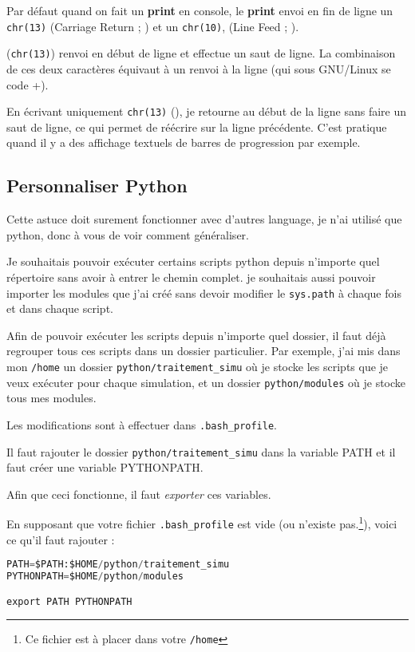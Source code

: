 \documentclass[a4paper,twoside]{article}
\begin{document}
Par défaut quand on fait un \textbf{print} en console, le \textbf{print} envoi en fin de ligne un \texttt{chr(13)} (Carriage Return ; ) et un \texttt{chr(10)}, (Line Feed ; ).

 (\texttt{chr(13)}) renvoi en début de ligne et  effectue un saut de ligne. La combinaison de ces deux caractères équivaut à un renvoi à la ligne (qui sous GNU/Linux se code +).

En écrivant uniquement \texttt{chr(13)} (), je retourne au début de la ligne sans faire un saut de ligne, ce qui permet de réécrire sur la ligne précédente. C'est pratique quand il y a des affichage textuels de barres de progression par exemple.


\subsection{Personnaliser Python}
Cette astuce doit surement fonctionner avec d'autres language, je  n'ai utilisé que python, donc à vous de voir comment généraliser.

Je souhaitais pouvoir exécuter certains scripts python depuis  n'importe quel répertoire sans avoir à entrer le chemin complet. je  souhaitais aussi pouvoir importer les modules que j'ai créé sans  devoir modifier le \texttt{sys.path} à chaque fois et dans chaque  script.

Afin de pouvoir exécuter les scripts depuis n'importe quel dossier,  il faut déjà regrouper tous ces scripts dans un dossier particulier.  Par exemple, j'ai mis dans mon \texttt{/home} un dossier \texttt {python/traitement\_simu} où je stocke les scripts que je veux  exécuter pour chaque simulation, et un dossier \texttt{python/modules} où je stocke tous mes modules.

Les modifications sont à effectuer dans \texttt{.bash\_profile}.

Il faut rajouter le dossier \texttt{python/traitement\_simu} dans la  variable PATH et il faut créer une variable PYTHONPATH.

\begin{attention}
Afin que ceci fonctionne, il faut \emph{exporter} ces variables.
\end{attention}

En supposant que votre fichier \texttt{.bash\_profile} est vide (ou  n'existe pas.\footnote{Ce fichier est à placer dans votre \texttt{/home}}), voici ce qu'il faut rajouter :
\begin{lstlisting}[language=python]
PATH=$PATH:$HOME/python/traitement_simu
PYTHONPATH=$HOME/python/modules

export PATH PYTHONPATH
\end{lstlisting}
\end{document}
